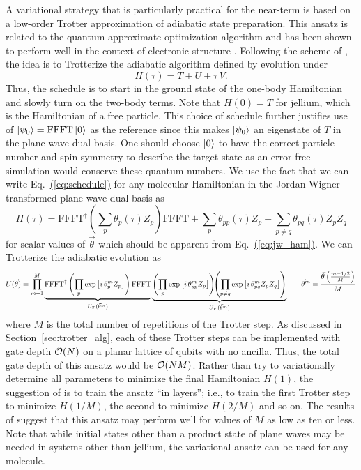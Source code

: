 \documentclass[superscriptaddress,aps,pra,nofootinbib,notitlepage,10pt,longbibliography]{revtex4-1}
\newcommand{\eq}[1]{Eq.~\hyperref[eq:#1]{(\ref*{eq:#1})}}
\renewcommand{\sec}[1]{\hyperref[sec:#1]{Section~\ref*{sec:#1}}}
\def\ket#1{\mathinner{|{#1}\rangle}}
\newcommand*{\bunderbrace}[1]{%
  \mathop{%
    \mathchoice
    {\underbrace{\displaystyle#1}}%
    {\underbrace{\textstyle#1}}%
    {\underbrace{\scriptstyle#1}}%
    {\underbrace{\scriptscriptstyle#1}}%
  }\limits
}
\begin{document}
A variational strategy that is particularly practical for the near-term is based on a low-order Trotter approximation of adiabatic state preparation. This ansatz is related to the quantum approximate optimization algorithm \cite{Farhi2014} and has been shown to perform well in the context of electronic structure \cite{Wecker2015a}. Following the scheme of \cite{Wecker2015a}, the idea is to Trotterize the adiabatic algorithm defined by evolution under
\begin{equation}
\label{eq:schedule}
H\left( \tau \right) = T + U + \tau \, V.
\end{equation}
Thus, the schedule is to start in the ground state of the one-body Hamiltonian and slowly turn on the two-body terms. Note that $H(0) = T$ for jellium, which is the Hamiltonian of a free particle. This choice of schedule further justifies use of $\ket{\psi_0} = \textrm{FFFT} \ket{0}$ as the reference since this makes $\ket{\psi_0}$ an eigenstate of $T$ in the plane wave dual basis. One should choose $\ket{0}$ to have the correct particle number and spin-symmetry to describe the target state as an error-free simulation would conserve these quantum numbers. We use the fact that we can write \eq{schedule} for any molecular Hamiltonian in the Jordan-Wigner transformed plane wave dual basis as
\begin{equation}
H\left(\tau \right) = \textrm{FFFT}^\dagger \left(\sum_{p} \theta_{p} \left(\tau\right) Z_p\right) \textrm{FFFT} + \sum_{p} \theta_{pp} \left(\tau\right) Z_p + \sum_{p\neq q} \theta_{pq}\left(\tau\right) Z_p Z_q
\end{equation}
for scalar values of $\vec \theta$ which should be apparent from \eq{jw_ham}. We can Trotterize the adiabatic evolution as
\begin{equation}
U(\vec \theta) = \prod_{m=1}^M \bunderbrace{\textrm{FFFT}^\dagger \left(\prod_{p} \exp\left[i \, \theta_{p}^m Z_p\right]\right) \textrm{FFFT}}_{U_T(\vec \theta^m)} \bunderbrace{\left(\prod_p \exp\left[i \, \theta_{pp}^m Z_p\right]\right) \!\! \left(\prod_{p\neq q} \exp\left[i \, \theta_{pq}^m Z_p Z_q\right]\right)}_{U_V(\vec \theta^m)}
\quad \quad \!
\vec \theta^m = \frac{\vec \theta \left(\frac{m - 1/2}{M}\right)}{M}
\end{equation}
where $M$ is the total number of repetitions of the Trotter step. As discussed in \sec{trotter_alg}, each of these Trotter steps can be implemented with gate depth ${\cal O}(N)$ on a planar lattice of qubits with no ancilla. Thus, the total gate depth of this ansatz would be ${\cal O}(NM)$. Rather than try to variationally determine all parameters to minimize the final Hamiltonian $H(1)$, the suggestion of \cite{Wecker2015a} is to train the ansatz ``in layers''; i.e., to train the first Trotter step to minimize $H(1/M)$, the second to minimize $H(2/M)$ and so on. The results of \cite{Wecker2015a} suggest that this ansatz may perform well for values of $M$ as low as ten or less. Note that while initial states other than a product state of plane waves may be needed in systems other than jellium, the variational ansatz can be used for any molecule.
\end{document}
